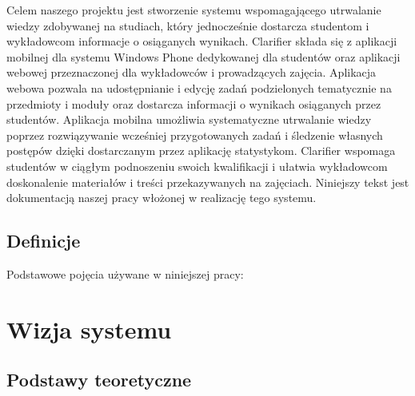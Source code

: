 \documentclass{pracamgr}
\begin{document}
Celem naszego projektu jest stworzenie systemu wspomagającego utrwalanie wiedzy zdobywanej na studiach, który jednocześnie dostarcza studentom i wykładowcom informacje o osiąganych wynikach. Clarifier składa się z aplikacji mobilnej dla systemu Windows Phone dedykowanej dla studentów oraz aplikacji webowej przeznaczonej dla wykładowców i prowadzących zajęcia. Aplikacja webowa pozwala na udostępnianie i edycję zadań podzielonych tematycznie na przedmioty i moduły oraz dostarcza informacji o wynikach osiąganych przez studentów. Aplikacja mobilna umożliwia systematyczne utrwalanie wiedzy poprzez rozwiązywanie wcześniej przygotowanych zadań i śledzenie własnych postępów dzięki dostarczanym przez aplikację statystykom. Clarifier wspomaga studentów w ciągłym podnoszeniu swoich kwalifikacji i ułatwia wykładowcom doskonalenie materiałów i treści przekazywanych na zajęciach.  
Niniejszy tekst jest dokumentacją naszej pracy włożonej w realizację tego systemu.

\section{Definicje}

Podstawowe pojęcia używane w niniejszej pracy:

\chapter{Wizja systemu}\label{r:vision}

\section{Podstawy teoretyczne}
\end{document}
